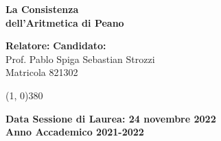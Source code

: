 \begin{titlepage}
	\begin{center}
		\Huge{
			\textbf{La Consistenza \\ dell'Aritmetica di Peano \\}
		}
	\end{center}
	
	\vspace{58mm}
	
	
	
	\begin{flushleft}
		\large{\hspace{15pt} \textbf{Relatore:} \hfill \textbf{Candidato:}}\\
		\vspace{6pt}
		\hspace{15pt} \large{Prof. Pablo Spiga} \hfill \large{Sebastian Strozzi}\\
		\vspace{1pt}
		\hfill \large{Matricola 821302}
	\end{flushleft}
	
	\vspace{20mm}
	\line(1, 0){380}
	\begin{center}
		{\large{\bf Data Sessione di Laurea: 24 novembre 2022}}\\
		{\large{\bf Anno Accademico 2021-2022}}
	\end{center}
	
	\restoregeometry
	
\end{titlepage}